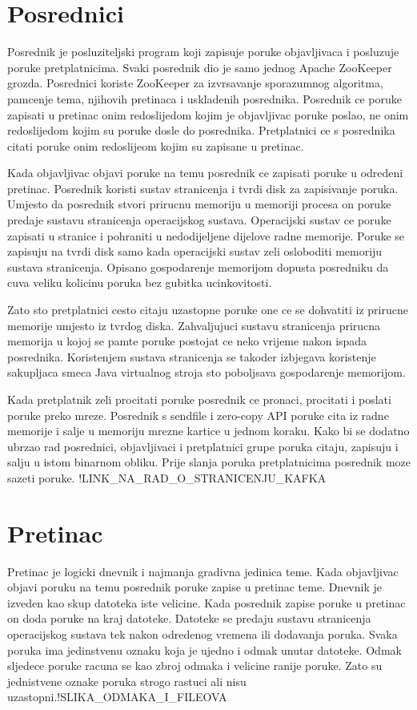 \documentclass[times, utf8, diplomski, numeric]{fer}
\begin{document}
\chapter{Posrednici}
Posrednik je posluziteljski program koji zapisuje poruke objavljivaca i posluzuje poruke pretplatnicima. Svaki posrednik dio je samo jednog Apache ZooKeeper grozda. Posrednici koriste ZooKeeper za izvrsavanje sporazumnog algoritma, pamcenje tema, njihovih pretinaca i uskladenih posrednika. Posrednik ce poruke zapisati u pretinac onim redoslijedom kojim je objavljivac poruke poslao, ne onim redoslijedom kojim su poruke dosle do posrednika. Pretplatnici ce s posrednika citati poruke onim redoslijeom kojim su zapisane u pretinac.

Kada objavljivac objavi poruke na temu posrednik ce zapisati poruke u odredeni pretinac. Posrednik koristi sustav stranicenja i tvrdi disk za zapisivanje poruka. Umjesto da posrednik stvori prirucnu memoriju u memoriji procesa on poruke predaje sustavu stranicenja operacijskog sustava. Operacijski sustav ce poruke zapisati u stranice i pohraniti u nedodijeljene dijelove radne memorije. Poruke se zapisuju na tvrdi disk samo kada operacijski sustav zeli osloboditi memoriju sustava stranicenja. Opisano gospodarenje memorijom dopusta posredniku da cuva veliku kolicinu poruka bez gubitka ucinkovitosti.

Zato sto pretplatnici cesto citaju uzastopne poruke one ce se dohvatiti iz prirucne memorije umjesto iz tvrdog diska. Zahvaljujuci sustavu stranicenja prirucna memorija u kojoj se pamte poruke postojat ce neko vrijeme nakon ispada posrednika. Koristenjem sustava stranicenja se takoder izbjegava koristenje sakupljaca smeca Java virtualnog stroja sto poboljsava gospodarenje memorijom.

Kada pretplatnik zeli procitati poruke posrednik ce pronaci, procitati i poslati poruke preko mreze. Posrednik s sendfile i zero-copy API poruke cita iz radne memorije i salje u memoriju mrezne kartice u jednom koraku. Kako bi se dodatno ubrzao rad posrednici, objavljivaci i pretplatnici grupe poruka citaju, zapisuju i salju u istom binarnom obliku. Prije slanja poruka pretplatnicima posrednik moze sazeti poruke. !LINK_NA_RAD_O_STRANICENJU_KAFKA 



\chapter{Pretinac}
Pretinac je logicki dnevnik i najmanja gradivna jedinica teme. Kada objavljivac objavi poruku na temu posrednik poruke zapise u pretinac teme. Dnevnik je izveden kao skup datoteka iste velicine. Kada posrednik zapise poruke u pretinac on doda poruke na kraj datoteke. Datoteke se predaju sustavu stranicenja operacijskog sustava tek nakon odredenog vremena ili dodavanja poruka. Svaka poruka ima jedinstvenu oznaku koja je ujedno i odmak unutar datoteke. Odmak sljedece poruke racuna se kao zbroj odmaka i velicine ranije poruke. Zato su jednistvene oznake poruka strogo rastuci ali nisu uzastopni.!SLIKA_ODMAKA_I_FILEOVA
\end{document}
